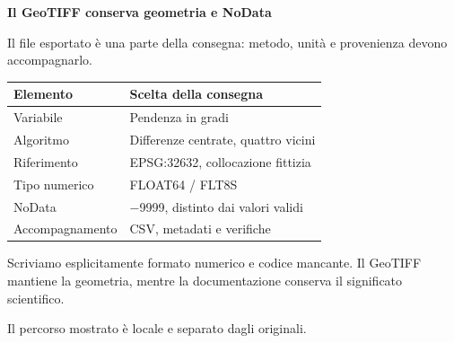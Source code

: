 \documentclass[12pt,aspectratio=1610]{beamer}
\newcommand{\PBody}[1]{\par{\fontsize{11.3}{14.8}\selectfont #1\par}}
\newcommand{\PSmall}[1]{\par{\fontsize{9.8}{13.1}\selectfont #1\par}}
\newcommand{\PCode}[2]{%
\begin{tcolorbox}[enhanced,arc=1.8mm,boxrule=.65pt,
  colback=white,colframe=Classical!75!Navy,colbacktitle=Navy,
  coltitle=white,fonttitle=\bfseries\fontsize{9.6}{12}\selectfont,
  title={#1},left=1.7mm,right=1.3mm,top=1.5mm,bottom=1.3mm,
  before skip=1mm,after skip=1mm]

\end{tcolorbox}}
\begin{document}
\begin{frame}[plain]\hypertarget{slide107}{}
\begin{lrbox}{\TitleBox}
\begin{minipage}[t]{17.7cm}\raggedright\color{Ink}\fontsize{11.3}{14.8}\selectfont
\color{Navy}\bfseries\fontsize{20.6}{24.5}\selectfont Il GeoTIFF conserva geometria e NoData
\end{minipage}\end{lrbox}

\begin{lrbox}{\RecallBox}
\begin{minipage}[t]{14.3cm}\raggedright\color{Ink}\fontsize{11.3}{14.8}\selectfont
\fontsize{10.3}{13.8}\selectfont Il file esportato è una parte della consegna: metodo, unità e provenienza devono accompagnarlo.
\end{minipage}\end{lrbox}

\begin{lrbox}{\PilotLeftBox}
\begin{minipage}[t]{10.05cm}\raggedright\color{Ink}\fontsize{11.3}{14.8}\selectfont
{\fontsize{10.2}{13.1}\selectfont\renewcommand{\arraystretch}{1.45}\begin{tabular}{@{}p{3.8cm}p{5.2cm}@{}}\toprule
\textbf{Elemento} & \textbf{Scelta della consegna}\\\midrule
Variabile & Pendenza in gradi\\
Algoritmo & Differenze centrate, quattro vicini\\
Riferimento & EPSG:32632, collocazione fittizia\\
Tipo numerico & FLOAT64 / FLT8S\\
NoData & −9999, distinto dai valori validi\\
Accompagnamento & CSV, metadati e verifiche\\
\bottomrule\end{tabular}}

\end{minipage}\end{lrbox}

\begin{lrbox}{\PilotRightBox}
\begin{minipage}[t]{7.55cm}\raggedright\color{Ink}\fontsize{11.3}{14.8}\selectfont
\PBody{Scriviamo esplicitamente formato numerico e codice mancante. Il GeoTIFF mantiene la geometria, mentre la documentazione conserva il significato scientifico.}
\vspace{2.5mm}
\PSmall{Il percorso mostrato è locale e separato dagli originali.}
\PCode{R · scrittura verificabile}{107_esempio.R}
\end{minipage}\end{lrbox}


\end{frame}
\end{document}
